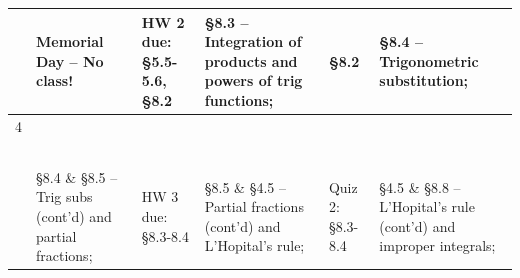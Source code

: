 \documentclass[11pt]{article}
\begin{document}
\begin{table}[ht!]
{\begin{tabular}{ | l | l | l | l | l | l |}
 & \begin{minipage}{0.18\textwidth}
Memorial Day -- No class!
\end{minipage}
& \begin{minipage}{.18\textwidth}
HW 2 due: \S 5.5-5.6, \S 8.2
\end{minipage}
& \begin{minipage}{.18\textwidth}
\S 8.3 -- Integration of products and powers of trig functions;
\end{minipage}
& \begin{minipage}{.18\textwidth}
\S8.2
\end{minipage}
& \begin{minipage}{.18\textwidth}
\S8.4 -- Trigonometric substitution;
\end{minipage}\\
\hline

4 & \begin{minipage}{0.18\textwidth}
{\bf June 7}\\
\end{minipage}
& \begin{minipage}{.18\textwidth}
{\bf June 8}\\
\end{minipage}
& \begin{minipage}{.18\textwidth}
{\bf June 9}\\
\end{minipage}
& \begin{minipage}{.18\textwidth}
{\bf June 10}\\
\end{minipage}
& \begin{minipage}{.18\textwidth}
{\bf June 11}\\
\end{minipage}\\

 & \begin{minipage}{0.18\textwidth}
      \S 8.4 \& \S 8.5 -- Trig subs (cont'd) and partial fractions;
\end{minipage}
& \begin{minipage}{.18\textwidth}
HW 3 due: \S 8.3-8.4
\end{minipage}
& \begin{minipage}{.18\textwidth}
     \S 8.5 \& \S 4.5 -- Partial fractions (cont'd) and L'Hopital's rule;
\end{minipage}
& \begin{minipage}{.18\textwidth}
Quiz 2: \S 8.3-8.4
\end{minipage}
& \begin{minipage}{.18\textwidth}
     \S 4.5 \& \S8.8 -- L'Hopital's rule (cont'd) and improper integrals;
\end{minipage}\\
\hline


\end{tabular}}
\end{table}
\end{document}
